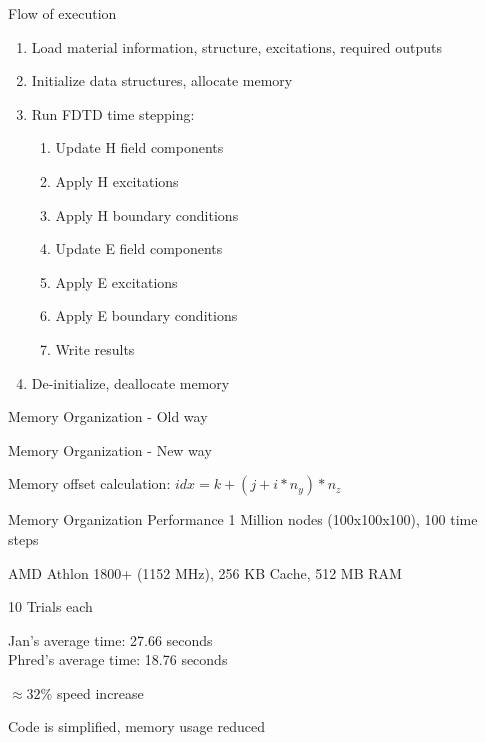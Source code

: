 \documentclass[pdf, nototal, slideBW]{prosper}
\newcommand{\insgraphic}[2]{
  \begin{center}
    \scalebox{#1}{
      \texttt{[image: \#2]}
    }
  \end{center}
}
\begin{document}


\begin{slide}{Flow of execution}
  \begin{enumerate}
  \item Load material information, structure, excitations, required
    outputs
  \item Initialize data structures, allocate memory
  \item Run FDTD time stepping:
    \begin{enumerate}
    \item Update H field components
    \item Apply H excitations
    \item Apply H boundary conditions
    \item Update E field components
    \item Apply E excitations
    \item Apply E boundary conditions
    \item Write results
    \end{enumerate}
  \item De-initialize, deallocate memory
  \end{enumerate}
\end{slide}

\begin{slide}{Memory Organization - Old way}
  \insgraphic{0.8}{jan-memory.eps}
\end{slide}

\begin{slide}{Memory Organization - New way}
  \insgraphic{0.8}{phred-memory.eps}

  Memory offset calculation: $idx = k + (j + i * n_y) * n_z$
\end{slide}

\begin{slide}{Memory Organization Performance}
  1 Million nodes (100x100x100), 100 time steps
  \vspace{0.5cm}

  AMD Athlon 1800+ (1152 MHz), 256 KB Cache, 512 MB RAM
  \vspace{0.5cm}
  
  10 Trials each
  \vspace{0.5cm}

  Jan's average time: 27.66 seconds\\
  Phred's average time: 18.76 seconds
  \vspace{0.5cm}

  $\approx 32\%$ speed increase
  \vspace{0.5cm}

  Code is simplified, memory usage reduced
\end{slide}
\end{document}
